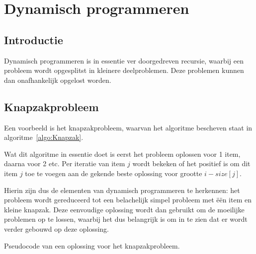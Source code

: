 \chapter{Dynamisch programmeren}

\section{Introductie}
Dynamisch programmeren is in essentie ver doorgedreven recursie, waarbij een probleem wordt opgesplitst in kleinere deelproblemen.
Deze problemen kunnen dan onafhankelijk opgelost worden.

\section{Knapzakprobleem}
Een voorbeeld is het knapzakprobleem, waarvan het algoritme bescheven staat in algoritme~\ref{algo:Knapzak}.

Wat dit algoritme in essentie doet is eerst het probleem oplossen voor 1 item, daarna voor 2 etc. 
Per iteratie van item $j$ wordt bekeken of het positief is om dit item $j$ toe te voegen aan de gekende beste oplossing voor grootte $i - size[j]$.

Hierin zijn dus de elementen van dynamisch programmeren te herkennen: het probleem wordt gereduceerd tot een belachelijk simpel probleem met \"e\"en item en kleine knapzak.
Deze eenvoudige oplossing wordt dan gebruikt om de moeilijke problemen op te lossen, waarbij het dus belangrijk is om in te zien dat er wordt verder gebouwd op deze oplossing.

\begin{algorithm}
    \caption{Pseudocode van een oplossing voor het knapzakprobleem.}
    \label{algo:Knapzak}
    \begin{algorithmic}
         
             
                    \EndIf
                \EndIf
            \EndFor    
        \EndFor
    \end{algorithmic}
\end{algorithm}

